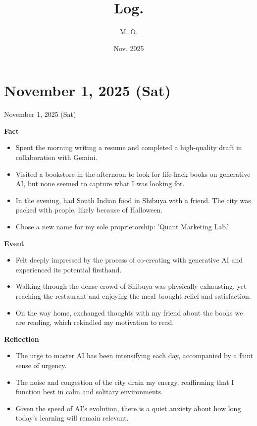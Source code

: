 \documentclass[dvipdfmx, autodetect-engine, aspectratio=169, 10.5pt]{beamer}
\title{
Log.
}
\author{
M. O.
}
\date{Nov. 2025}
\begin{document}
\maketitle

\section{November 1, 2025 (Sat)}  
\begin{frame}{November 1, 2025 (Sat)}  
	\tiny  

	\textbf{Fact}  
	\begin{itemize}
		\item Spent the morning writing a resume and completed a high-quality draft in collaboration with Gemini.  
		\item Visited a bookstore in the afternoon to look for life-hack books on generative AI, but none seemed to capture what I was looking for.  
		\item In the evening, had South Indian food in Shibuya with a friend. The city was packed with people, likely because of Halloween.  
		\item Chose a new name for my sole proprietorship: 'Quant Marketing Lab.'  
	\end{itemize}

	\textbf{Event}  
	\begin{itemize}
		\item Felt deeply impressed by the process of co-creating with generative AI and experienced its potential firsthand.  
		\item Walking through the dense crowd of Shibuya was physically exhausting, yet reaching the restaurant and enjoying the meal brought relief and satisfaction.  
		\item On the way home, exchanged thoughts with my friend about the books we are reading, which rekindled my motivation to read.  
	\end{itemize}

	\textbf{Reflection}  
	\begin{itemize}
		\item The urge to master AI has been intensifying each day, accompanied by a faint sense of urgency.  
		\item The noise and congestion of the city drain my energy, reaffirming that I function best in calm and solitary environments.  
		\item Given the speed of AI's evolution, there is a quiet anxiety about how long today's learning will remain relevant.  
	\end{itemize}


\end{frame}
\end{document}

